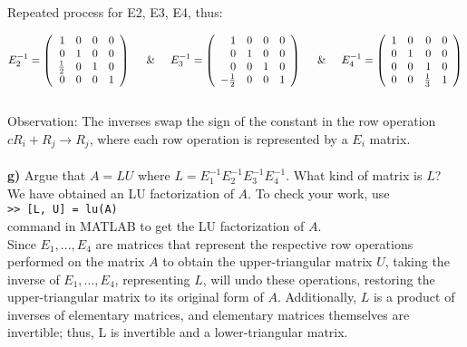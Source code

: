 \documentclass{article}
\begin{document}
Repeated process for E2, E3, E4, thus:

\[
E_2^{-1} = 
\left(
\begin{array}{rrrr}
1 & 0 & 0 & 0 \\
0 & 1 & 0 & 0 \\
\frac{1}{2} & 0 & 1 & 0 \\
0 & 0 & 0 & 1 
\end{array}
\right)
\hspace{0.5cm} \& \hspace{0.5cm}
E_3^{-1} = 
\left(
\begin{array}{rrrr}
1 & 0 & 0 & 0 \\
0 & 1 & 0 & 0 \\
0 & 0 & 1 & 0 \\
-\frac{1}{2} & 0 & 0 & 1 
\end{array}
\right)
\hspace{0.5cm} \& \hspace{0.5cm}
E_4^{-1} = 
\left(
\begin{array}{rrrr}
1 & 0 & 0 & 0 \\
0 & 1 & 0 & 0 \\
0 & 0 & 1 & 0 \\
0 & 0 & \frac{1}{3} & 1 
\end{array}
\right)
\]\\

Observation: The inverses swap the sign of the constant in the row operation $cR_i + R_j \rightarrow R_j$, where each row operation is represented by a $E_i$ matrix.\\\\

{\bf g)} Argue that $A = LU$ where $L= E_1^{-1}E_2^{-1} E_3^{-1}E_4^{-1}$. What
kind of matrix is $L$? \\
We have obtained
an LU factorization of $A$. To check your work, use \\
{\tt >> [L, U] = lu(A)} \\
command in MATLAB to get the LU factorization of $A$. \\

Since $E_1, ..., E_4$ are matrices that represent the respective row operations performed on the matrix $A$ to obtain the upper-triangular matrix $U$, taking the inverse of $E_1, ..., E_4$, representing $L$, will undo these operations, restoring the upper-triangular matrix to its original form of $A$. Additionally, $L$ is a product of inverses of elementary matrices, and elementary matrices themselves are invertible; thus, L is invertible and a lower-triangular matrix.\\\\
\end{document}
